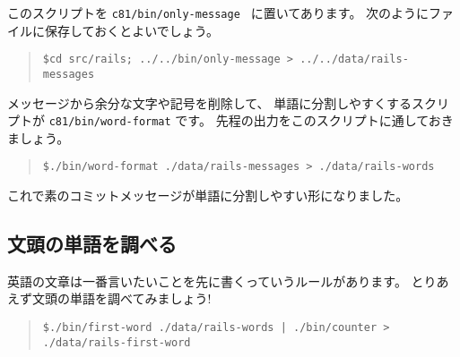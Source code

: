 \documentclass{jarticle}
\begin{document}
このスクリプトを {\tt c81/bin/only-message } に置いてあります。
次のようにファイルに保存しておくとよいでしょう。
\begin{quote}
{\tt \$cd src/rails; ../../bin/only-message > ../../data/rails-messages }
\end{quote}

メッセージから余分な文字や記号を削除して、
単語に分割しやすくするスクリプトが {\tt c81/bin/word-format} です。
先程の出力をこのスクリプトに通しておきましょう。
\begin{quote}
{\tt \$./bin/word-format ./data/rails-messages > ./data/rails-words }
\end{quote}

これで素のコミットメッセージが単語に分割しやすい形になりました。


  \subsection{文頭の単語を調べる}
  英語の文章は一番言いたいことを先に書くっていうルールがあります。
  とりあえず文頭の単語を調べてみましょう!
  \begin{quote}
   {\tt \$./bin/first-word ./data/rails-words | ./bin/counter > ./data/rails-first-word}
  \end{quote}
\end{document}
